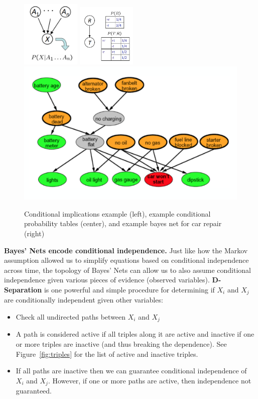 \documentclass[11pt]{article}
\begin{document}
\begin{figure}[ht]
    \centering
    \includegraphics[width=0.25\textwidth]{figs/bayes1.png}
    \includegraphics[width=0.25\textwidth]{figs/bayes2.png}
    \includegraphics[scale=0.4]{figs/carrepair}
    \caption{Conditional implications example (left), example conditional probability tables (center), and example bayes net for car repair (right)}
    \label{fig:bayes}
\end{figure}

\textbf{Bayes' Nets encode conditional independence.} Just like how the Markov assumption allowed us to simplify equations based on conditional independence across time, the topology of Bayes' Nets can allow us to also assume conditional independence given various pieces of evidence (observed variables). \textbf{D-Separation} is one powerful and simple procedure for determining if $X_i$ and  $X_j$ are conditionally independent given other variables:
\begin{itemize}
    \item Check all undirected paths between $X_i$ and $X_j$
    \item A path is considered active if all triples along it are active and inactive if one or more triples are inactive (and thus breaking the dependence). See Figure~\ref{fig:triples} for the list of active and inactive triples.
    \item If all paths are inactive then we can guarantee conditional independence of $X_i$ and $X_j$. However, if one or more paths are active, then independence not guaranteed.
\end{itemize}
\end{document}
